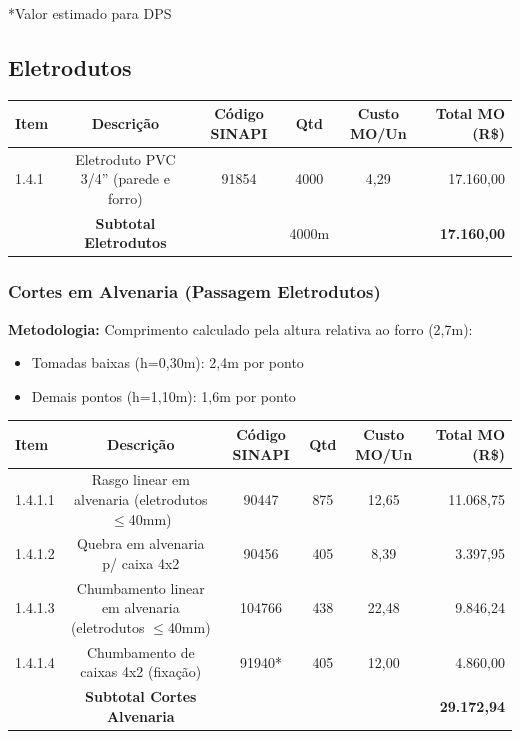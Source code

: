 \documentclass[12pt,a4paper]{article}
\renewenvironment{table}%
{\begin{center}%
\scriptsize%
\addtolength{\tabcolsep}{-2pt}%
}%
{\end{center}}
\begin{document}
\noindent\small{*Valor estimado para DPS}

\subsection{Eletrodutos}

\begin{table}
\centering
\begin{tabular}{lccccr}
\toprule
\textbf{Item} & \textbf{Descrição} & \textbf{Código SINAPI} & \textbf{Qtd} & \textbf{Custo MO/Un} & \textbf{Total MO (R\$)} \\
\midrule
1.4.1 & Eletroduto PVC 3/4'' (parede e forro) & 91854 & 4000 & 4,29 & 17.160,00 \\
\midrule
 & \textbf{Subtotal Eletrodutos} & & 4000m & & \textbf{17.160,00} \\
\bottomrule
\end{tabular}
\end{table}

\subsubsection{Cortes em Alvenaria (Passagem Eletrodutos)}

\noindent\textbf{Metodologia:} Comprimento calculado pela altura relativa ao forro (2,7m):
\begin{itemize}
    \item Tomadas baixas (h=0,30m): 2,4m por ponto
    \item Demais pontos (h=1,10m): 1,6m por ponto
\end{itemize}

\begin{table}
\centering
\begin{tabular}{lccccr}
\toprule
\textbf{Item} & \textbf{Descrição} & \textbf{Código SINAPI} & \textbf{Qtd} & \textbf{Custo MO/Un} & \textbf{Total MO (R\$)} \\
\midrule
1.4.1.1 & Rasgo linear em alvenaria (eletrodutos $\leq$40mm) & 90447 & 875 & 12,65 & 11.068,75 \\
1.4.1.2 & Quebra em alvenaria p/ caixa 4x2 & 90456 & 405 & 8,39 & 3.397,95 \\
1.4.1.3 & Chumbamento linear em alvenaria (eletrodutos $\leq$40mm) & 104766 & 438 & 22,48 & 9.846,24 \\
1.4.1.4 & Chumbamento de caixas 4x2 (fixação) & 91940* & 405 & 12,00 & 4.860,00 \\
\midrule
 & \textbf{Subtotal Cortes Alvenaria} & & & & \textbf{29.172,94} \\
\bottomrule
\end{tabular}
\end{table}
\end{document}
